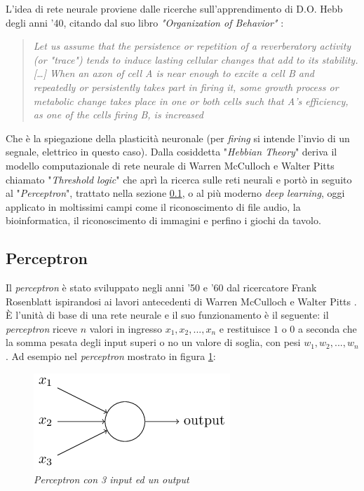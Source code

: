 \documentclass[12pt,a4paper]{report}
\begin{document}
L'idea di rete neurale proviene dalle ricerche sull'apprendimento di D.O. Hebb degli anni '40, citando dal suo libro \textit{"Organization of Behavior"} \cite{hebb-learning}:

\begin{quote}
 \begin{center}
  \textit{Let us assume that the persistence or repetition of a reverberatory activity (or "trace") tends to induce lasting cellular changes that add to its stability.[…] When an axon of cell A is near enough to excite a cell B and repeatedly or persistently takes part in firing it, some growth process or metabolic change takes place in one or both cells such that A's efficiency, as one of the cells firing B, is increased}
 \end{center}
\end{quote} 

Che è la spiegazione della plasticità neuronale (per \textit{firing} si intende l'invio di un segnale, elettrico in questo caso).
Dalla cosiddetta "\textit{Hebbian Theory}" deriva il modello computazionale di rete neurale di  Warren McCulloch e Walter Pitts chiamato "\textit{Threshold logic}" che aprì la ricerca sulle reti neurali e portò in seguito al "\textit{Perceptron}", trattato nella sezione \ref{percettrone}, o al più moderno \textit{deep learning},  oggi applicato in moltissimi campi come il riconoscimento di file audio, la bioinformatica, il riconoscimento di immagini e perfino i giochi da tavolo.

\subsection{Perceptron}\label{percettrone}

Il \textit{perceptron} è stato sviluppato negli anni '50 e '60 dal ricercatore Frank Rosenblatt ispirandosi ai lavori antecedenti di Warren McCulloch e Walter Pitts \cite{neural-net-nielsen}.
È l'unità di base di una rete neurale e il suo funzionamento è il seguente:
il \textit{perceptron} riceve $n$ valori in ingresso $x_{1},x_{2},...,x_{n}$ e restituisce $1$ o $0$ a seconda che la somma pesata degli input superi o no un valore di soglia, con pesi $w_{1},w_{2},...,w_{n}$.
Ad esempio nel \textit{perceptron} mostrato in figura \ref{perceptron}:

\begin{figure}[H]
 \centering
 \includegraphics[scale = 0.7]{images/perceptron.png}
 \caption{\textit{Perceptron con 3 input ed un output}}
 \label{perceptron}
\end{figure}
\end{document}
